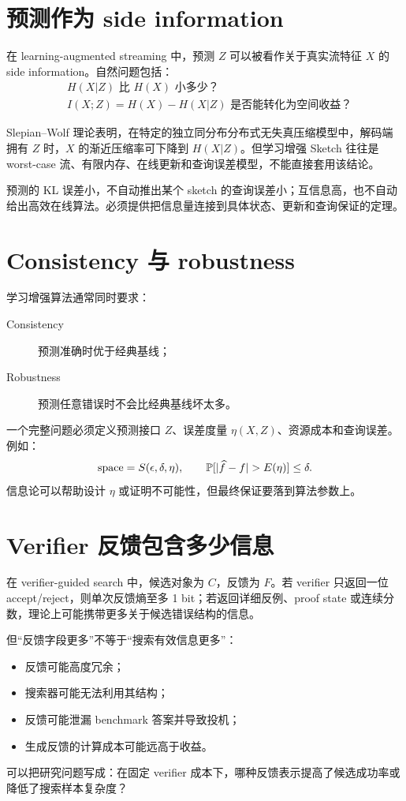 \section{预测作为 side information}

在 learning-augmented streaming 中，预测 $Z$ 可以被看作关于真实流特征 $X$ 的 side information。自然问题包括：
\begin{align*}
&H(X|Z)\text{ 比 }H(X)\text{ 小多少？}\\
&I(X;Z)=H(X)-H(X|Z)\text{ 是否能转化为空间收益？}
\end{align*}

Slepian--Wolf 理论表明，在特定的独立同分布分布式无失真压缩模型中，解码端拥有 $Z$ 时，$X$ 的渐近压缩率可下降到 $H(X|Z)$。但学习增强 Sketch 往往是 worst-case 流、有限内存、在线更新和查询误差模型，不能直接套用该结论。

\begin{warningbox}
预测的 KL 误差小，不自动推出某个 sketch 的查询误差小；互信息高，也不自动给出高效在线算法。必须提供把信息量连接到具体状态、更新和查询保证的定理。
\end{warningbox}

\section{Consistency 与 robustness}

学习增强算法通常同时要求：
\begin{description}
  \item[Consistency] 预测准确时优于经典基线；
  \item[Robustness] 预测任意错误时不会比经典基线坏太多。
\end{description}
一个完整问题必须定义预测接口 $Z$、误差度量 $\eta(X,Z)$、资源成本和查询误差。例如：
\[
\text{space}=S(\epsilon,\delta,\eta),
\qquad
\Prb[|\widehat f-f|>E(\eta)]\le\delta.
\]
信息论可以帮助设计 $\eta$ 或证明不可能性，但最终保证要落到算法参数上。

\section{Verifier 反馈包含多少信息}

在 verifier-guided search 中，候选对象为 $C$，反馈为 $F$。若 verifier 只返回一位 accept/reject，则单次反馈熵至多 1 bit；若返回详细反例、proof state 或连续分数，理论上可能携带更多关于候选错误结构的信息。

但“反馈字段更多”不等于“搜索有效信息更多”：
\begin{itemize}
  \item 反馈可能高度冗余；
  \item 搜索器可能无法利用其结构；
  \item 反馈可能泄漏 benchmark 答案并导致投机；
  \item 生成反馈的计算成本可能远高于收益。
\end{itemize}
可以把研究问题写成：在固定 verifier 成本下，哪种反馈表示提高了候选成功率或降低了搜索样本复杂度？

